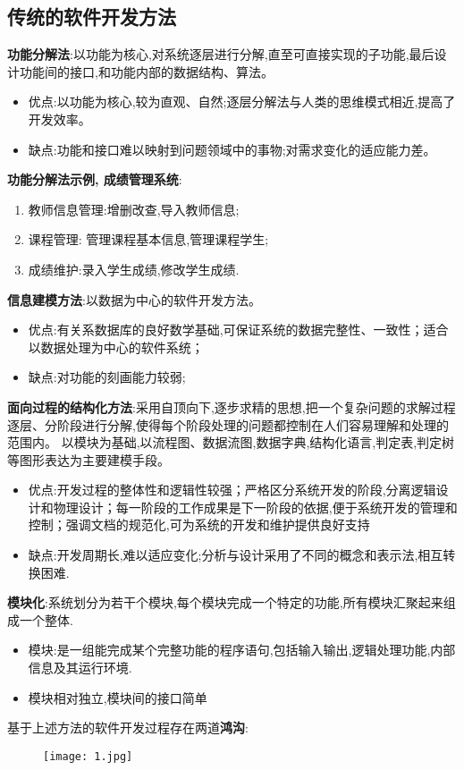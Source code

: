\documentclass[../main.tex]{subfiles}
\begin{document}
\subsection{传统的软件开发方法}
\textbf{功能分解法}:以功能为核心,对系统逐层进行分解,直至可直接实现的子功能,最后设计功能间的接口,和功能内部的数据结构、算法。
\begin{itemize}
  \item 优点:以功能为核心,较为直观、自然;逐层分解法与人类的思维模式相近,提高了开发效率。
  \item 缺点:功能和接口难以映射到问题领域中的事物;对需求变化的适应能力差。
\end{itemize}
\textbf{功能分解法示例, 成绩管理系统}:
\begin{enumerate}
  \item 教师信息管理:增删改查,导入教师信息;
  \item 课程管理: 管理课程基本信息,管理课程学生;
  \item 成绩维护:录入学生成绩,修改学生成绩.
\end{enumerate}
\textbf{信息建模方法}:以数据为中心的软件开发方法。
\begin{itemize}
  \item 优点:有关系数据库的良好数学基础,可保证系统的数据完整性、一致性；适合以数据处理为中心的软件系统；
  \item 缺点:对功能的刻画能力较弱;
\end{itemize}
\textbf{面向过程的结构化方法}:采用自顶向下,逐步求精的思想,把一个复杂问题的求解过程逐层、分阶段进行分解,使得每个阶段处理的问题都控制在人们容易理解和处理的范围内。
以模块为基础,以流程图、数据流图,数据字典,结构化语言,判定表,判定树等图形表达为主要建模手段。
\begin{itemize}
  \item 优点:开发过程的整体性和逻辑性较强；严格区分系统开发的阶段,分离逻辑设计和物理设计；每一阶段的工作成果是下一阶段的依据,便于系统开发的管理和控制；强调文档的规范化,可为系统的开发和维护提供良好支持
  \item 缺点:开发周期长,难以适应变化;分析与设计采用了不同的概念和表示法,相互转换困难.
\end{itemize}
\textbf{模块化}:系统划分为若干个模块,每个模块完成一个特定的功能,所有模块汇聚起来组成一个整体.
\begin{itemize}
  \item 模块:是一组能完成某个完整功能的程序语句,包括输入输出,逻辑处理功能,内部信息及其运行环境.
  \item 模块相对独立,模块间的接口简单
\end{itemize}
基于上述方法的软件开发过程存在两道\textbf{鸿沟}:
\begin{figure}[H]
  \begin{center}
    \texttt{[image: 1.jpg]}
  \end{center}
\end{figure}
\end{document}
